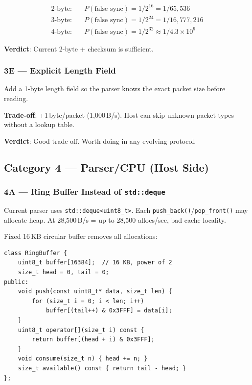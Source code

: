 \documentclass[11pt,a4paper]{article}
\begin{document}
\begin{align}
\text{2-byte:} \quad & P(\text{false sync}) = 1/2^{16} = 1/65{,}536 \nonumber\\
\text{3-byte:} \quad & P(\text{false sync}) = 1/2^{24} = 1/16{,}777{,}216 \nonumber\\
\text{4-byte:} \quad & P(\text{false sync}) = 1/2^{32} \approx 1/4.3 \times 10^9 \nonumber
\end{align}

\textbf{Verdict}: Current 2-byte + checksum is sufficient.

\subsubsection{3E --- Explicit Length Field}

Add a 1-byte length field so the parser knows the exact packet size before reading.

\textbf{Trade-off}: +1\,byte/packet (1,000\,B/s). Host can skip unknown packet types without a lookup table.

\textbf{Verdict}: Good trade-off. Worth doing in any evolving protocol.

\subsection{Category 4 --- Parser/CPU (Host Side)}

\subsubsection{4A --- Ring Buffer Instead of \texttt{std::deque}}

Current parser uses \texttt{std::deque<uint8\_t>}. Each \texttt{push\_back()}/\texttt{pop\_front()} may allocate heap. At 28,500\,B/s = up to 28,500 allocs/sec, bad cache locality.

Fixed 16\,KB circular buffer removes all allocations:

\begin{lstlisting}[style=cpp, caption={Ring buffer implementation sketch}]
class RingBuffer {
    uint8_t buffer[16384];  // 16 KB, power of 2
    size_t head = 0, tail = 0;
public:
    void push(const uint8_t* data, size_t len) {
        for (size_t i = 0; i < len; i++)
            buffer[(tail++) & 0x3FFF] = data[i];
    }
    uint8_t operator[](size_t i) const {
        return buffer[(head + i) & 0x3FFF];
    }
    void consume(size_t n) { head += n; }
    size_t available() const { return tail - head; }
};
\end{lstlisting}
\end{document}
